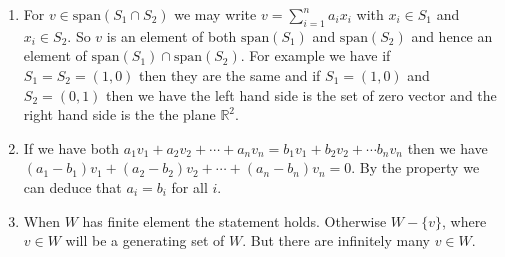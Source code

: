 \begin{enumerate}
\item For $v\in \mathrm{span}(S_1\cap S_2)$ we may write $v=\sum_{i=1}^n{a_ix_i}$ with $x_i \in S_1$ and $x_i \in S_2$. So $v$ is an element of both $\mathrm{span}(S_1)$ and $\mathrm{span}(S_2)$ and hence an element of $\mathrm{span}(S_1)\cap \mathrm{span}(S_2)$. For example we have if $S_1=S_2=(1,0)$ then they are the same and if $S_1=(1,0)$ and $S_2=(0,1)$ then we have the left hand side is the set of zero vector and the right hand side is the the plane $\mathbb{R}^2$.
\item If we have both $a_1v_1+a_2v_2+\cdots +a_nv_n=b_1v_1+b_2v_2+\cdots b_nv_n$ then we have $(a_1-b_1)v_1+(a_2-b_2)v_2+\cdots +(a_n-b_n)v_n=0$. By the property we can deduce that $a_i=b_i$ for all $i$.
\item When $W$ has finite element the statement holds. Otherwise $W-\{v\}$, where $v\in W$ will be a generating set of $W$. But there are infinitely many $v\in W$.
\end{enumerate}